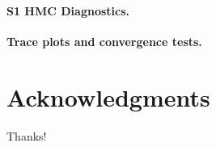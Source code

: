 \documentclass[10pt,letterpaper]{article}
\begin{document}
\paragraph*{S1 HMC Diagnostics.}
\label{S1_Diag}
{\bf Trace plots and convergence tests.}

\section*{Acknowledgments}

Thanks!

\nolinenumbers

%
%
% 



\end{document}
